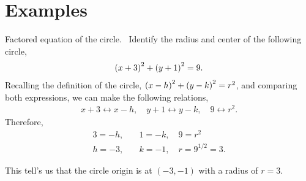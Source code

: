 \documentclass[../main-exe.tex]{subfiles}
\begin{document}
\section{Examples}

\begin{example}{Factored equation of the circle.}{~}
    Identify the radius and center of the following circle,
    \begin{gather*}
        \qty(x+3)^2 + \qty(y+1)^2 = 9.
    \end{gather*}
    Recalling the definition of the circle, $\qty(x-h)^2 + \qty(y-k)^2 = r^2$, and comparing both expressions, we can make the following relations,
    \begin{align*}
        x+3 \longleftrightarrow x-h,\quad y+1 \longleftrightarrow y-k,\quad 9 \longleftrightarrow r^2.
    \end{align*}
    Therefore,
    \begin{align*}
        3 = -h,\quad & 1 = -k,\quad  9 = r^2 \\
        h = -3,\quad & k = -1,\quad  r = 9^{1/2} = 3.
    \end{align*}

    This tell's us that the circle origin is at $(-3,-1)$ with a radius of $r=3$.

\end{example}
\end{document}
